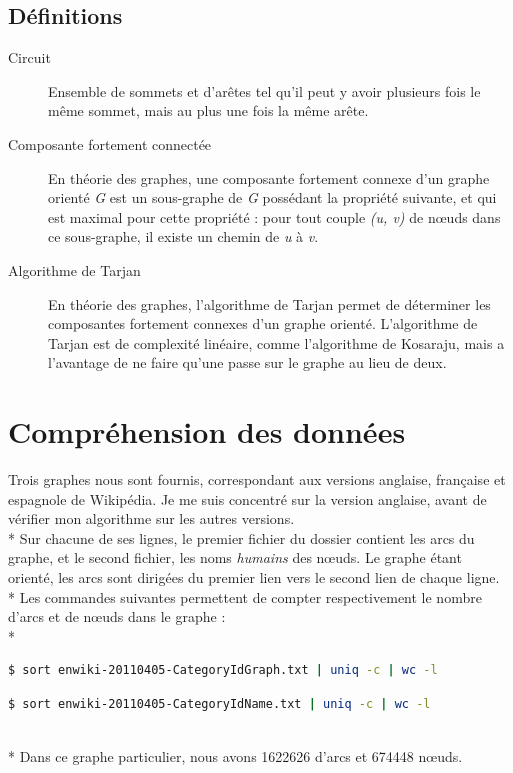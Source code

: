 \documentclass{article}
\begin{document}
\subsection{D\'{e}finitions}
\label{definitions}
\begin{description}
\item[Circuit]
Ensemble de sommets et d'ar\^{e}tes tel qu'il peut y avoir plusieurs fois le m\^{e}me sommet, mais au plus une fois la m\^{e}me ar\^{e}te.
\item[Composante fortement connect\'{e}e]
En th\'{e}orie des graphes, une composante fortement connexe d'un graphe orient\'{e} \textit{G} est un sous-graphe de \textit{G} poss\'{e}dant la propri\'{e}t\'{e} suivante, et qui est maximal pour cette propri\'{e}t\'{e} : pour tout couple \textit{(u, v)} de n\oe uds dans ce sous-graphe, il existe un chemin de \textit{u} \`{a} \textit{v}.
\item[Algorithme de Tarjan]
En th\'{e}orie des graphes, l'algorithme de Tarjan permet de d\'{e}terminer les composantes fortement connexes d'un graphe orient\'{e}. L'algorithme de Tarjan est de complexit\'{e} lin\'{e}aire, comme l'algorithme de Kosaraju, mais a l'avantage de ne faire qu'une passe sur le graphe au lieu de deux.
\end{description} 
 

\section{Compr\'{e}hension des donn\'{e}es}

Trois graphes nous sont fournis, correspondant aux versions anglaise, fran\c{c}aise et espagnole de Wikip\'{e}dia. Je me suis concentr\'{e} sur la version anglaise, avant de v\'{e}rifier mon algorithme sur les autres versions.
\\*
Sur chacune de ses lignes, le premier fichier du dossier contient les arcs du graphe, et le second fichier, les noms \textit{humains} des n\oe uds. Le graphe \'{e}tant orient\'{e}, les arcs sont dirig\'{e}es du premier lien vers le second lien de chaque ligne.
\\*
Les commandes suivantes permettent de compter respectivement le nombre d'arcs et de n\oe uds dans le graphe : \\*
\begin{tcolorbox}
\begin{lstlisting}[language=sh]
$ sort enwiki-20110405-CategoryIdGraph.txt | uniq -c | wc -l
\end{lstlisting}
\begin{lstlisting}[language=sh]
$ sort enwiki-20110405-CategoryIdName.txt | uniq -c | wc -l
\end{lstlisting}
\end{tcolorbox}
~\\*
Dans ce graphe particulier, nous avons 1622626 d'arcs et 674448 n\oe uds.
 
\end{document}
